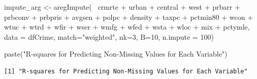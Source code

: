 \documentclass[]{article}
\newenvironment{Shaded}{}{}
\newcommand{\DataTypeTok}[1]{#1}
\newcommand{\DecValTok}[1]{#1}
\newcommand{\KeywordTok}[1]{\textcolor[rgb]{0.00,0.00,1.00}{#1}}
\newcommand{\NormalTok}[1]{#1}
\newcommand{\OperatorTok}[1]{#1}
\newcommand{\StringTok}[1]{\textcolor[rgb]{0.00,0.50,0.50}{#1}}
\begin{document}
\begin{Shaded}
\begin{Highlighting}[]
\NormalTok{impute_arg <-}\StringTok{ }\KeywordTok{aregImpute}\NormalTok{(}\OperatorTok{~}\StringTok{ }\NormalTok{crmrte }\OperatorTok{+}\StringTok{  }\NormalTok{urban }\OperatorTok{+}\StringTok{ }\NormalTok{central }\OperatorTok{+}\StringTok{ }\NormalTok{west }\OperatorTok{+}
\StringTok{                         }\NormalTok{prbarr }\OperatorTok{+}\StringTok{ }\NormalTok{prbconv }\OperatorTok{+}\StringTok{ }\NormalTok{prbpris }\OperatorTok{+}\StringTok{ }\NormalTok{avgsen }\OperatorTok{+}\StringTok{ }\NormalTok{polpc }\OperatorTok{+}
\StringTok{                         }\NormalTok{density }\OperatorTok{+}\StringTok{ }\NormalTok{taxpc }\OperatorTok{+}\StringTok{ }\NormalTok{pctmin80 }\OperatorTok{+}\StringTok{ }\NormalTok{wcon }\OperatorTok{+}\StringTok{ }\NormalTok{wtuc }\OperatorTok{+}
\StringTok{                         }\NormalTok{wtrd }\OperatorTok{+}\StringTok{ }\NormalTok{wfir }\OperatorTok{+}\StringTok{ }\NormalTok{wser }\OperatorTok{+}\StringTok{ }\NormalTok{wmfg }\OperatorTok{+}\StringTok{ }\NormalTok{wfed }\OperatorTok{+}\StringTok{ }\NormalTok{wsta }\OperatorTok{+}\StringTok{ }\NormalTok{wloc }\OperatorTok{+}
\StringTok{                         }\NormalTok{mix }\OperatorTok{+}\StringTok{ }\NormalTok{pctymle, }\DataTypeTok{data =}\NormalTok{ dfCrime, }\DataTypeTok{match=}\StringTok{"weighted"}\NormalTok{,}
                         \DataTypeTok{nk=}\DecValTok{3}\NormalTok{, }\DataTypeTok{B=}\DecValTok{10}\NormalTok{, }\DataTypeTok{n.impute =} \DecValTok{100}\NormalTok{)}
\end{Highlighting}
\end{Shaded}

\begin{Shaded}
\begin{Highlighting}[]
\KeywordTok{paste}\NormalTok{(}\StringTok{"R-squares for Predicting Non-Missing Values for Each Variable"}\NormalTok{)}
\end{Highlighting}
\end{Shaded}

\begin{verbatim}
[1] "R-squares for Predicting Non-Missing Values for Each Variable"
\end{verbatim}

\begin{Shaded}
\end{Shaded}
\end{document}
